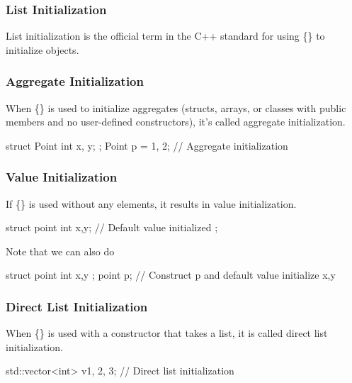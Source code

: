 \documentclass{report}
\begin{document}
    \bigbreak \noindent 
    \subsubsection{List Initialization}
    \bigbreak \noindent 
    List initialization is the official term in the C++ standard for using \{\} to initialize objects.

    \bigbreak \noindent 
    \subsubsection{Aggregate Initialization}
    \bigbreak \noindent 
    When \{\} is used to initialize aggregates (structs, arrays, or classes with public members and no user-defined constructors), it's called aggregate initialization.
    \bigbreak \noindent 
    \begin{cppcode}
        struct Point {
            int x, y;
        };
        Point p = {1, 2}; // Aggregate initialization
    \end{cppcode}


    \bigbreak \noindent 
    \subsubsection{Value Initialization}
    \bigbreak \noindent 
    If \{\} is used without any elements, it results in value initialization.
    \bigbreak \noindent 
    \begin{cppcode}
        struct  point {
            int x{},y{}; // Default value initialized
        };
    \end{cppcode}
    \bigbreak \noindent 
    Note that we can also do
    \bigbreak \noindent 
    \begin{cppcode}
        struct point {
            int x,y
        };
        point p{}; // Construct p and default value initialize x,y
    \end{cppcode}

    \bigbreak \noindent 
    \subsubsection{Direct List Initialization}
    \bigbreak \noindent 
    When \{\} is used with a constructor that takes a list, it is called direct list initialization.
    \bigbreak \noindent 
    \begin{cppcode}
    std::vector<int> v{1, 2, 3}; // Direct list initialization
    \end{cppcode}
\end{document}

